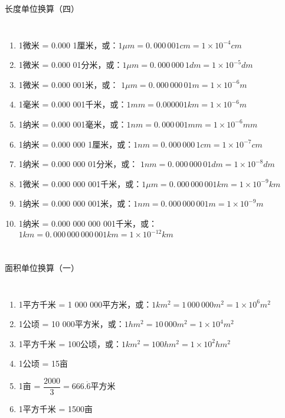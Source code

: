 \documentclass[aspectratio=169]{ctexbeamer} %
\begin{document}
\begin{frame}[t]{长度单位换算（四）}
\begin{columns}
\begin{enumerate}[label={\Alph*.}]
\item 1微米 = 0.000 1厘米，或：$1 \mu m = 0. \, 000 \, 001 cm = 1 \times 10^{-4} cm$ 
\item 1微米 = 0.000 01分米，或：$1 \mu m = 0. \, 000 \, 000 \, 1 dm = 1 \times 10^{-5} dm$ 
\item 1微米 = 0.000 001米，或： $1 \mu m = 0. \, 000 \, 000 \, 01 m = 1 \times 10^{-6} m$ 
\item 1毫米 = 0.000 001千米，或：$1 mm = 0.000 001 km = 1 \times 10^{-6} m$ 
\item 1纳米 = 0.000 001毫米，或：$1 nm = 0. \, 000 \, 001 mm = 1 \times 10^{-6} mm$ 
\item 1纳米 = 0.000 000 1厘米，或：$1 nm = 0. \, 000 \, 000 \, 1 cm = 1 \times 10^{-7} cm$ 
\item 1纳米 = 0.000 000 01分米，或： $1 nm = 0. \, 000 \, 000 \, 01 dm = 1 \times 10^{-8} dm$ 
\item 1微米 = 0.000 000 001千米，或：$1 \mu m = 0. \, 000 \, 000 \, 001 km = 1 \times 10^{-9} km$ 
\item 1纳米 = 0.000 000 001米，或：$1 nm = 0. \, 000 \, 000 \, 001 m = 1 \times 10^{-9} m$ 
\item 1纳米 = 0.000 000 000 001千米，或：$1km = 0. \, 000 \, 000 \, 000 \, 001 km = 1 \times 10^{-12} km$ 
\end{enumerate}
\end{columns}
\end{frame}

\begin{frame}[t]{面积单位换算（一）}
\begin{columns}
\begin{enumerate}[label={\Alph*.}]
\item 1平方千米 = 1 000 000平方米，或：$1km^2 = 1 \, 000 \, 000m^2 = 1×10^6 m^2$ 
\item 1公顷 = 10 000平方米，或：$1hm^2 = 10\,000m^2 = 1×10^4 m^2$ 
\item 1平方千米 = 100公顷，或：$1km^2 = 100hm^2 = 1×10^2 hm^2$ 
\item 1公顷 = 15亩 
\item 1亩 = $\dfrac{2000}{3} = 666.\dot{6}$平方米 
\item 1平方千米 = 1500亩 
\end{enumerate}
\end{columns}
\end{frame}
\end{document}
